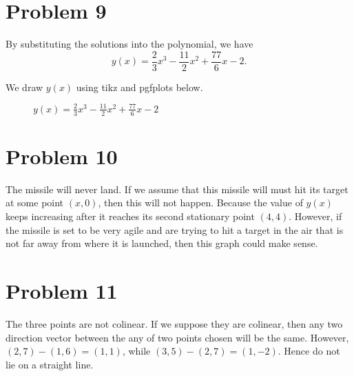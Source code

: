 \documentclass[12pt,a4paper]{article}
\begin{document}
\section*{Problem 9}
\begin{solution}
By substituting the solutions into the polynomial, we have
\[
y(x) = \frac{2}{3}x^3 -\frac{11}{2}x^2 + \frac{77}{6}x -2.
\]

We draw $y(x)$ using tikz and pgfplots below.

\begin{figure}[H]
    \centering
{}

    \caption{$y(x) = \frac{2}{3}x^3 -\frac{11}{2}x^2 + \frac{77}{6}x -2$}
    \label{w3cubgraph}
\end{figure}
\end{solution}

\section*{Problem 10}
\begin{solution}
    The missile will never land. If we assume that this missile will must hit its target at some point $(x, 0)$, then this will not happen. Because the value of $y(x)$ keeps increasing after it reaches its second stationary point $(4,4)$. However, if the missile is set to be very agile and are trying to hit a target in the air that is not far away from where it is launched, then this graph could make sense.


\end{solution}
\section*{Problem 11}
\begin{solution}
The three points are not colinear. If we suppose they are colinear, then any two direction vector between the any of two points chosen will be the same. However, $(2,7)-(1,6) = (1,1)$, while $(3,5)-(2,7) = (1,-2)$. Hence do not lie on a straight line.
\end{solution}
\end{document}
